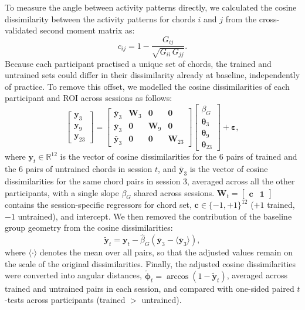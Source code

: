 \documentclass{article}
\begin{document}
To measure the angle between activity patterns directly, we calculated the cosine dissimilarity between the activity patterns for chords $i$ and $j$ from the cross-validated second moment matrix as:
\begin{equation}
    c_{ij} = 1 - \frac{G_{ij}}{\sqrt{G_{ii}\,G_{jj}}}.
\end{equation}
Because each participant practised a unique set of chords, the trained and untrained sets could differ in their dissimilarity already at baseline, independently of practice. To remove this offset, we modelled the cosine dissimilarities of each participant and ROI across sessions as follows:
\begin{equation}
    \begin{bmatrix} \mathbf{y}_3 \\ \mathbf{y}_9 \\ \mathbf{y}_{23} \end{bmatrix}
    =
    \begin{bmatrix}
        \bar{\mathbf{y}}_3 & \mathbf{W}_3 & \mathbf{0} & \mathbf{0} \\
        \bar{\mathbf{y}}_3 & \mathbf{0} & \mathbf{W}_9 & \mathbf{0} \\
        \bar{\mathbf{y}}_3 & \mathbf{0} & \mathbf{0} & \mathbf{W}_{23}
    \end{bmatrix}
    \begin{bmatrix} \beta_G \\ \boldsymbol{\theta}_3 \\ \boldsymbol{\theta}_9 \\ \boldsymbol{\theta}_{23} \end{bmatrix}
    + \boldsymbol{\varepsilon},
\end{equation}
where $\mathbf{y}_t \in \mathbb{R}^{12}$ is the vector of cosine dissimilarities for the 6 pairs of trained and the 6 pairs of untrained chords in session $t$, and $\bar{\mathbf{y}}_3$ is the vector of cosine dissimilarities for the same chord pairs in session 3, averaged across all the other participants, with a single slope $\beta_G$ shared across sessions. $\mathbf{W}_t = \begin{bmatrix} \mathbf{c} & \mathbf{1} \end{bmatrix}$ contains the session-specific regressors for chord set, $\mathbf{c} \in \{-1, +1\}^{12}$ ($+1$ trained, $-1$ untrained), and intercept. We then removed the contribution of the baseline group geometry from the cosine dissimilarities:
\begin{equation}
    \tilde{\mathbf{y}}_t = \mathbf{y}_t - \hat{\beta}_G\left(\bar{\mathbf{y}}_3 - \langle \bar{\mathbf{y}}_3 \rangle\right),
\end{equation}
where $\langle\cdot\rangle$ denotes the mean over all pairs, so that the adjusted values remain on the scale of the original dissimilarities. Finally, the adjusted cosine dissimilarities were converted into angular distances, $\tilde{\boldsymbol{\phi}}_t = \arccos(1 - \tilde{\mathbf{y}}_t)$, averaged across trained and untrained pairs in each session, and compared with one-sided paired $t$-tests across participants (trained $>$ untrained).
\end{document}
